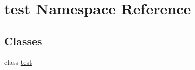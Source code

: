 \hypertarget{namespacetest}{}\section{test Namespace Reference}
\label{namespacetest}
\subsection*{Classes}
\begin{DoxyCompactItemize}
\item 
class \hyperlink{classtest_1_1test}{test}
\end{DoxyCompactItemize}
